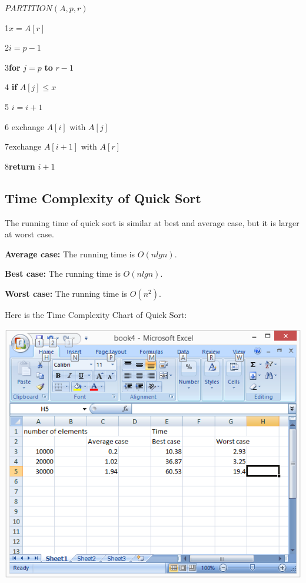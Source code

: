 \documentclass[9 pt]{report}
\begin{document}
\vspace{0.5cm}

$PARTITION(A,p,r)$

1\hspace{0.5cm}$x=A[r]$

2\hspace{0.5cm}$i=p-1$

3\hspace{0.5cm}\textbf{for} $j=p$  \textbf{to} $r-1$

4\hspace{1cm} \textbf{if} $A[j] \leq x$

5\hspace{1.5cm} $i=i+1$

6\hspace{1.5cm} exchange $A[i]$ with $A[j]$

7\hspace{0.5cm}exchange $A[i+1]$ with $A[r]$

8\hspace{0.5cm}\textbf{return} $i+1$

\subsection{Time Complexity of Quick Sort}

The running time of quick sort is similar at best and average case, but it is larger at worst case.

\vspace{0.5cm}

\textbf{Average case:} The running time is $O(nlgn)$.

\textbf{Best case:} The running time is $O(nlgn)$.

\textbf{Worst case:} The running time is $O(n^2)$.


\vspace{0.5cm}

Here is the Time Complexity Chart of Quick Sort:

\includegraphics{quickdata.png}
\end{document}
